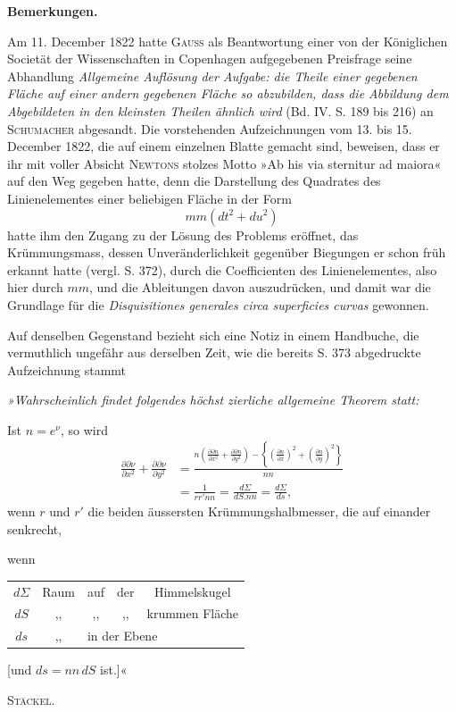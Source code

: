 %
\begin{center}\bfseries Bemerkungen.\end{center}
\noindent\hspace*{1.2em} Am 11. December 1822 hatte \textsc{Gauss} als Beantwortung einer von der Königlichen Societät der Wissenschaften in Copenhagen aufgegebenen Preisfrage seine Abhandlung \textit{Allgemeine Auflösung der Aufgabe: die Theile einer gegebenen Fläche auf einer andern gegebenen Fläche so abzubilden, dass die Abbildung dem Abgebildeten in den kleinsten Theilen ähnlich wird} (Bd. IV. S. 189 bis 216) an \textsc{Schumacher} abgesandt. Die vorstehenden Aufzeichnungen vom 13. bis 15. December 1822, die auf einem einzelnen Blatte gemacht sind, beweisen, dass er ihr mit voller Absicht \textsc{Newtons} stolzes Motto »Ab his via sternitur ad maiora« auf den Weg gegeben hatte, denn die Darstellung des Quadrates des Linienelementes einer beliebigen Fläche in der Form
\[
mm(dt^2+du^2)
\]
hatte ihm den Zugang zu der Lösung des Problems eröffnet, das Krümmungsmass, dessen Unveränderlichkeit gegenüber Biegungen er schon früh erkannt hatte (vergl. S. 372), durch die Coefficienten des Linienelementes, also hier durch $mm$, und die Ableitungen davon auszudrücken, und damit war die Grundlage für die \textit{Disquisitiones generales circa superficies curvas} gewonnen.

Auf denselben Gegenstand bezieht sich eine Notiz in einem Handbuche, die vermuthlich ungefähr aus derselben Zeit, wie die bereits S. 373 abgedruckte Aufzeichnung stammt

{\itshape »Wahrscheinlich findet folgendes höchst zierliche allgemeine Theorem statt:

Ist $n=e^\nu$, so wird
\[
\begin{aligned}
\frac{\partial\partial\nu}{\partial x^2}+\frac{\partial\partial\nu}{\partial y^2}
&=\frac{n\left(\frac{\partial\partial n}{\partial x^2}+\frac{\partial\partial n}{\partial y^2}\right)-\left\{\left(\frac{\partial n}{\partial x}\right)^2+\left(\frac{\partial n}{\partial y}\right)^2\right\}}{nn}\\
&=\frac1{rr'nn}=\frac{d\Sigma}{dS.nn}=\frac{d\Sigma}{ds},
\end{aligned}
\]
wenn $r$ und $r'$ die beiden äussersten Krümmungshalbmesser, die auf einander senkrecht,

 wenn
\begin{center}
\begin{tabular}{ccccc}
$d\Sigma$&Raum&auf&der&Himmelskugel\\
$dS$&,,&,,&,,&krummen Fläche\\
$ds$&,,&\multicolumn{3}{l}{in der Ebene}
\end{tabular}
\end{center}
[und $ds=nn\,dS$ ist.]«\par}
\begin{flushright}\textsc{Stäckel.}\end{flushright}
